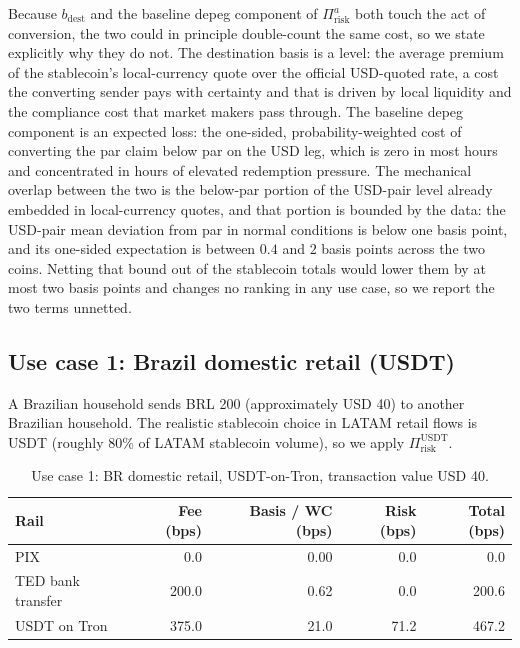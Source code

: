 Because $b_{\text{dest}}$ and the baseline depeg component of $\Pi_{\text{risk}}^{a}$ both touch the act of conversion, the two could in principle double-count the same cost, so we state explicitly why they do not. The destination basis is a level: the average premium of the stablecoin's local-currency quote over the official USD-quoted rate, a cost the converting sender pays with certainty and that is driven by local liquidity and the compliance cost that market makers pass through. The baseline depeg component is an expected loss: the one-sided, probability-weighted cost of converting the par claim below par on the USD leg, which is zero in most hours and concentrated in hours of elevated redemption pressure. The mechanical overlap between the two is the below-par portion of the USD-pair level already embedded in local-currency quotes, and that portion is bounded by the data: the USD-pair mean deviation from par in normal conditions is below one basis point, and its one-sided expectation is between $0.4$ and $2$ basis points across the two coins. Netting that bound out of the stablecoin totals would lower them by at most two basis points and changes no ranking in any use case, so we report the two terms unnetted.

\subsection{Use case 1: Brazil domestic retail (USDT)}\label{sub:bra_domestic}

A Brazilian household sends BRL 200 (approximately USD 40) to another Brazilian household. The realistic stablecoin choice in LATAM retail flows is USDT (roughly 80\% of LATAM stablecoin volume), so we apply $\Pi_{\text{risk}}^{\text{USDT}}$.

\begin{table}[H]
\centering
\caption{Use case 1: BR domestic retail, USDT-on-Tron, transaction value USD 40.}\label{tab:uc1}
\begin{tabular}{lrrrr}
\toprule
Rail & Fee (bps) & Basis / WC (bps) & Risk (bps) & Total (bps) \\
\midrule
PIX                  & 0.0    & 0.00  & 0.0  & 0.0   \\
TED bank transfer    & 200.0  & 0.62  & 0.0  & 200.6 \\
USDT on Tron         & 375.0  & 21.0  & 71.2 & 467.2 \\
\bottomrule
\end{tabular}
\end{table}

